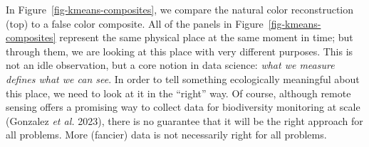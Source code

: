 \documentclass[
  letterpaper,
]{scrbook}
\begin{document}
{
\makeatletter
\def\LT@makecaption#1#2#3{%
  \noalign{\smash{\hbox{\kern\textwidth\rlap{\kern\marginparsep
  \parbox[t]{\marginparwidth}{%
    \footnotesize{%
      \vspace{(1.1\baselineskip)}
    #1{#2: }\ignorespaces #3}}}}}}%
    }
\makeatother

\begin{figure}[bt]



\end{figure}%

}

In Figure~\ref{fig-kmeans-composites}, we compare the natural color
reconstruction (top) to a false color composite. All of the panels in
Figure~\ref{fig-kmeans-composites} represent the same physical place at
the same moment in time; but through them, we are looking at this place
with very different purposes. This is not an idle observation, but a
core notion in data science: \emph{what we measure defines what we can
see}. In order to tell something ecologically meaningful about this
place, we need to look at it in the ``right'' way. Of course, although
remote sensing offers a promising way to collect data for biodiversity
monitoring at scale (Gonzalez \emph{et al.} 2023), there is no guarantee
that it will be the right approach for all problems. More (fancier) data
is not necessarily right for all problems.
\end{document}

